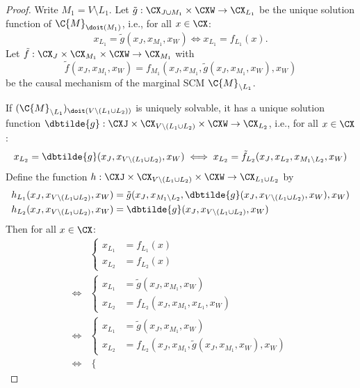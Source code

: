 \begin{proof}
  Write $M_1 = V \setminus L_1$.
  Let $\tilde{g} : \CX_{J\cup M_1} \times \CXW \to \CX_{L_1}$ be the unique solution function of $\C{M}_{\doit(M_1)}$,
  i.e., for all $x \in \CX$:
  $$x_{L_1} = \tilde{g}(x_J,x_{M_1},x_W) \iff x_{L_1} = f_{L_1}(x).$$
  Let $\tilde{f} : \CX_J \times \CX_{M_1} \times \CXW \to \CX_{M_1}$ with
  $$\tilde{f}(x_J,x_{M_1},x_W) = f_{M_1}(x_J,x_{M_1},\tilde{g}(x_J,x_{M_1},x_W),x_W)$$
  be the causal mechanism of the marginal SCM $\C{M}_{\setminus L_1}$.

  If $(\C{M}_{\setminus L_1})_{\doit(V\setminus(L_1\cup L_2))}$ is uniquely solvable, it has a unique solution function
  $\dbtilde{g} : \CXJ \times \CX_{V\setminus (L_1\cup L_2)} \times \CXW \to \CX_{L_2}$, i.e., for all $x \in \CX$:
  $$x_{L_2} = \dbtilde{g}(x_J,x_{V\setminus(L_1\cup L_2)},x_W) \iff x_{L_2} = \tilde{f}_{L_2}(x_J,x_{L_2},x_{M_1\setminus L_2},x_W)$$
  Define the function $h : \CXJ \times \CX_{V\setminus(L_1\cup L_2)} \times \CXW \to \CX_{L_1 \cup L_2}$ by
  \begin{align*}
    h_{L_1}(x_J,x_{V\setminus(L_1\cup L_2)},x_W) &= \tilde{g}(x_J,x_{M_1\setminus L_2},\dbtilde{g}(x_J,x_{V\setminus(L_1 \cup L_2)},x_W),x_W) \\
    h_{L_2}(x_J,x_{V\setminus(L_1\cup L_2)},x_W) &= \dbtilde{g}(x_J,x_{V\setminus(L_1 \cup L_2)},x_W)
  \end{align*}
  Then for all $x \in \CX$:
  \begin{equation*}\begin{split}
    & \begin{cases}
      x_{L_1} &= f_{L_1}(x) \\
      x_{L_2} &= f_{L_2}(x) 
    \end{cases} \\
    \iff &
    \begin{cases}
      x_{L_1} &= \tilde{g}(x_J,x_{M_1},x_W) \\
      x_{L_2} &= f_{L_2}(x_J,x_{M_1},x_{L_1},x_W) 
    \end{cases} \\
    \iff &
    \begin{cases}
      x_{L_1} &= \tilde{g}(x_J,x_{M_1},x_W) \\
      x_{L_2} &= f_{L_2}(x_J,x_{M_1},\tilde{g}(x_J,x_{M_1},x_W),x_W) 
    \end{cases} \\
    \iff &
    \begin{cases}

\end{cases}
\end{split}
\end{equation*}
\end{proof}
